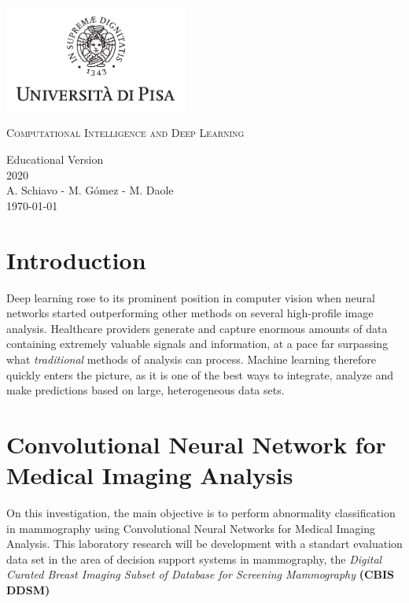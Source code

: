 \documentclass{book}
\begin{document}
    \begin{titlepage}
        \centering
        \includegraphics[width=6cm]{logo-unipi.png}
        \vfill
        \vspace{1.5cm}
        {\huge\textsc{Computational Intelligence and Deep Learning}\par}
        {\Large
            Educational Version\\
            2020\\
            \vspace{2cm}
            A. Schiavo - M. Gómez - M. Daole \\
            \vspace{2cm}
            \today
        }    
        \vfill
        \vfill
    \end{titlepage}
    \tableofcontents


    \chapter{Introduction}

    Deep learning rose to its prominent position in computer vision when neural networks started outperforming other methods on several high-profile image analysis. Healthcare providers generate and capture enormous amounts of data containing extremely valuable signals and information, at a pace far surpassing what \textit{traditional} methods of analysis can process. Machine learning therefore quickly enters the picture, as it is one of the best ways to integrate, analyze and make predictions based on large, heterogeneous data sets. 



    \chapter{Convolutional Neural Network for Medical Imaging Analysis}

    On this investigation, the main objective is to perform abnormality classification in mammography using Convolutional Neural Networks for Medical Imaging Analysis. This laboratory research will be development with a standart evaluation data set in the area of decision support systems in mammography, the \textit{Digital Curated Breast Imaging Subset of Database for Screening Mammography} \textbf{(CBIS DDSM)}
    
\end{document}
